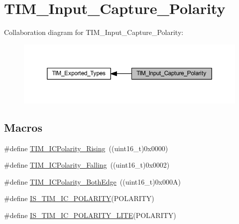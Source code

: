 \hypertarget{group___t_i_m___input___capture___polarity}{}\section{T\+I\+M\+\_\+\+Input\+\_\+\+Capture\+\_\+\+Polarity}
\label{group___t_i_m___input___capture___polarity}
Collaboration diagram for T\+I\+M\+\_\+\+Input\+\_\+\+Capture\+\_\+\+Polarity\+:
\nopagebreak
\begin{figure}[H]
\begin{center}
\leavevmode
\includegraphics[width=350pt]{group___t_i_m___input___capture___polarity}
\end{center}
\end{figure}
\subsection*{Macros}
\begin{DoxyCompactItemize}
\item 
\#define \hyperlink{group___t_i_m___input___capture___polarity_gabe598596b7dbcac446a4918105fa95a6}{T\+I\+M\+\_\+\+I\+C\+Polarity\+\_\+\+Rising}~((uint16\+\_\+t)0x0000)
\item 
\#define \hyperlink{group___t_i_m___input___capture___polarity_ga70c6f5ed30a236bac4c690928e742243}{T\+I\+M\+\_\+\+I\+C\+Polarity\+\_\+\+Falling}~((uint16\+\_\+t)0x0002)
\item 
\#define \hyperlink{group___t_i_m___input___capture___polarity_ga4632a6425d407c0d28b610b2d31cccc8}{T\+I\+M\+\_\+\+I\+C\+Polarity\+\_\+\+Both\+Edge}~((uint16\+\_\+t)0x000\+A)
\item 
\#define \hyperlink{group___t_i_m___input___capture___polarity_ga6aff2fe442fd9662a0bb8731134cda89}{I\+S\+\_\+\+T\+I\+M\+\_\+\+I\+C\+\_\+\+P\+O\+L\+A\+R\+I\+TY}(P\+O\+L\+A\+R\+I\+TY)
\item 
\#define \hyperlink{group___t_i_m___input___capture___polarity_gaaae722dd6c33a224df267c703824b94c}{I\+S\+\_\+\+T\+I\+M\+\_\+\+I\+C\+\_\+\+P\+O\+L\+A\+R\+I\+T\+Y\+\_\+\+L\+I\+TE}(P\+O\+L\+A\+R\+I\+TY)
\end{DoxyCompactItemize}


